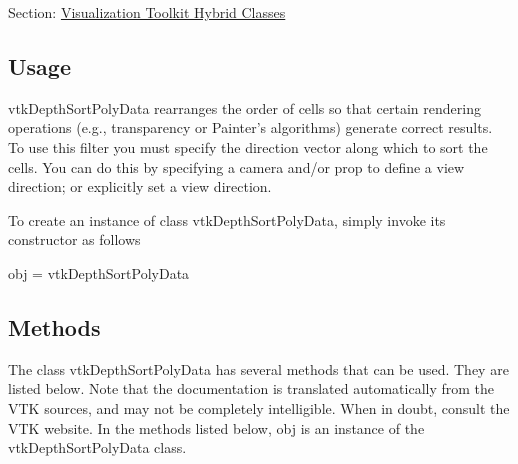 Section\-: \hyperlink{sec_vtkhybrid}{Visualization Toolkit Hybrid Classes} \hypertarget{vtkwidgets_vtkxyplotwidget_Usage}{}\subsection{Usage}\label{vtkwidgets_vtkxyplotwidget_Usage}
vtk\-Depth\-Sort\-Poly\-Data rearranges the order of cells so that certain rendering operations (e.\-g., transparency or Painter's algorithms) generate correct results. To use this filter you must specify the direction vector along which to sort the cells. You can do this by specifying a camera and/or prop to define a view direction; or explicitly set a view direction.

To create an instance of class vtk\-Depth\-Sort\-Poly\-Data, simply invoke its constructor as follows \begin{DoxyVerb}  obj = vtkDepthSortPolyData
\end{DoxyVerb}
 \hypertarget{vtkwidgets_vtkxyplotwidget_Methods}{}\subsection{Methods}\label{vtkwidgets_vtkxyplotwidget_Methods}
The class vtk\-Depth\-Sort\-Poly\-Data has several methods that can be used. They are listed below. Note that the documentation is translated automatically from the V\-T\-K sources, and may not be completely intelligible. When in doubt, consult the V\-T\-K website. In the methods listed below, {\ttfamily obj} is an instance of the vtk\-Depth\-Sort\-Poly\-Data class. 
